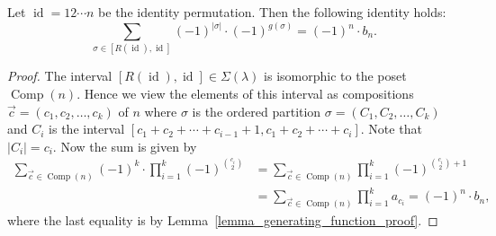 \documentclass[ALCO,ThmDefs,Unicode,epreuves]{cedram}
\DeclareMathOperator{\Comp}{Comp}
\DeclareMathOperator{\id}{id}
\begin{document}
\begin{prop}
Let $\id = 12 \cdots n$ be the identity permutation.
Then the following identity holds:
$$
\sum_{\sigma \in [R(\id),\id]} (-1)^{|\sigma|} \cdot (-1)^{g(\sigma)}
=
(-1)^{n} \cdot b_{n} .
$$
\label{proposition_b_n}
\end{prop}
\begin{proof}
The interval
$[R(\id),\id] \in \Sigma(\lambda)$
is isomorphic to the poset $\Comp(n)$.
Hence we view the elements of this interval as
compositions $\vec{c} = (c_{1}, c_{2}, \ldots, c_{k})$ of $n$
where $\sigma$ is the ordered partition
$\sigma = (C_{1},C_{2}, \ldots, C_{k})$
and
$C_{i}$ is the interval $[c_{1}+c_{2}+\cdots+c_{i-1}+1, c_{1}+c_{2}+\cdots+c_{i}]$.
Note that $|C_{i}| = c_{i}$.
Now the sum is given by
\begin{align*}
\sum_{\vec{c} \in \Comp(n)} (-1)^{k} \cdot  \prod_{i=1}^{k} (-1)^{\binom{c_{i}}{2}}
& =
\sum_{\vec{c} \in \Comp(n)} \prod_{i=1}^{k} (-1)^{\binom{c_{i}}{2} + 1} \\
& =
\sum_{\vec{c} \in \Comp(n)} \prod_{i=1}^{k} a_{c_{i}}
=
(-1)^{n} \cdot b_{n} , 
\end{align*}
where the last equality is by Lemma~\ref{lemma_generating_function_proof}.
\end{proof}
\end{document}

